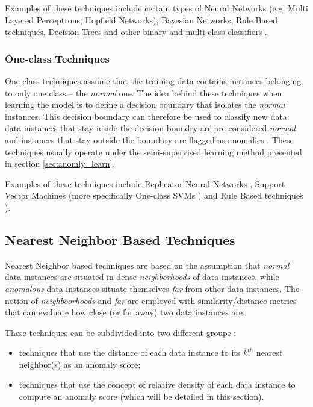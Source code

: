 Examples of these techniques include certain types of Neural Networks (e.g. Multi Layered Perceptrons, Hopfield Networks), Bayesian Networks, Rule Based techniques, Decision Trees and other binary and multi-class classifiers \cite{Kandhari2009}.

\subsubsection{One-class Techniques}\mbox{}

One-class techniques assume that the training data contains instances belonging to only one class -- the \textit{normal} one. The idea behind these techniques when learning the model is to define a decision boundary that isolates the \textit{normal} instances.
This decision boundary can therefore be used to classify new data: data instances that stay inside the decision boundry are are considered \textit{normal} and instances that stay outside the boundary are flagged as anomalies \cite{Kandhari2009}.
These techniques usually operate under the semi-supervised learning method presented in section \ref{sec:anomly_learn}.

Examples of these techniques include Replicator Neural Networks \cite{Hawkins}, Support Vector Machines (more specifically One-class SVMs \cite{Sc}) and Rule Based techniques \cite{Kandhari2009}).

\subsection{Nearest Neighbor Based Techniques}

Nearest Neighbor based techniques are based on the assumption that \textit{normal} data instances are situated in dense \textit{neighborhoods} of data instances, while \textit{anomalous} data instances situate themselves \textit{far} from other data instances.
The notion of \textit{neighboorhoods} and \textit{far} are employed with similarity/distance metrics that can evaluate how close (or far away) two data instances are.

These techniques can be subdivided into two different groups \cite{Kandhari2009}:
\begin{itemize}
	\item techniques that use the distance of each data instance to its $k^{th}$ nearest neighbor(s) as an anomaly score;
	
	\item techniques that use the concept of relative density of each data instance to compute an anomaly score (which will be detailed in this section).
\end{itemize}

